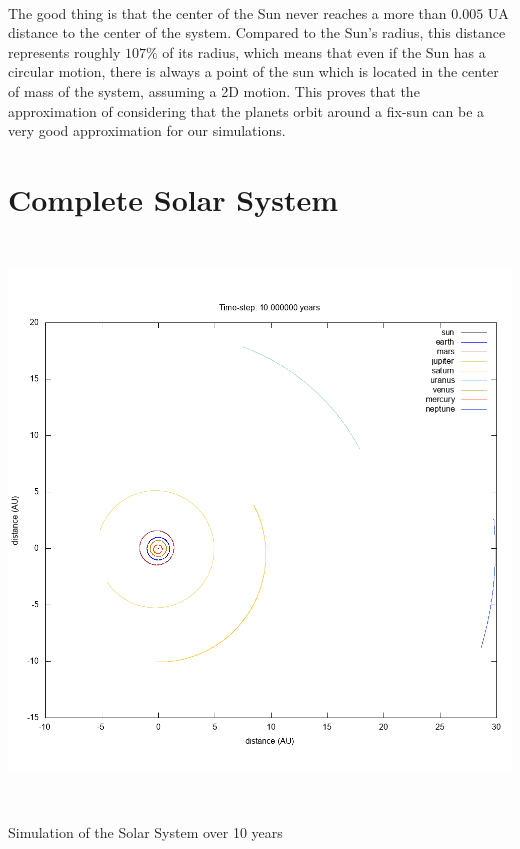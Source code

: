 \documentclass[a4paper, twoside, 11pt]{report}
\theoremstyle{theorem}
\theoremstyle{remark}
\theoremstyle{exemple}
\begin{document}
                \paragraph{}The good thing is that the center of the Sun never reaches a more than $0.005$ UA distance to the center of the system. Compared to the Sun's radius, this distance represents roughly $107\%$ of its radius, which means that even if the Sun has a circular motion, there is always a point of the sun which is located in the center of mass of the system, assuming a 2D motion. This proves that the approximation of considering that the planets orbit around a fix-sun can be a very good approximation for our simulations.
                
                
            
    \section{Complete Solar System}
        \begin{center}
            \includegraphics[width=15cm,height=15cm]{System_10}
        \end{center}
        \begin{center}
            Simulation of the Solar System over 10 years
        \end{center}
        
\end{document}
